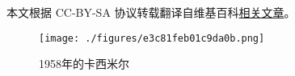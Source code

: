 
本文根据 CC-BY-SA 协议转载翻译自维基百科\href{https://en.wikipedia.org/wiki/Hendrik_Casimir}{相关文章}。

\begin{figure}[ht]
\centering
\texttt{[image: ./figures/e3c81feb01c9da0b.png]}
\caption{1958年的卡西米尔} \label{fig_KXMR_1}
\end{figure}